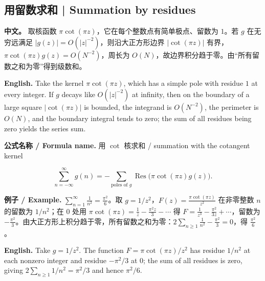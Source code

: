 \documentclass[UTF8,11pt,a4paper]{ctexart}
\newcommand{\EN}[1]{\par\noindent \textbf{English.} #1\par}
\newcommand{\FORMULA}[2]{\par\noindent\textbf{公式名称 / Formula name.} #1 / #2\par}
\newcommand{\EX}[2]{\par\noindent \textbf{例子 / Example.} #1\par\EN{#2}}
\newcommand{\APS}[2]{\par\noindent\textbf{中文。} #1\par\noindent\textbf{English.} #2\par\smallskip}
\begin{document}
\subsection{用留数求和 | Summation by residues}
\APS{取核函数 $\pi\cot(\pi z)$，它在每个整数点有简单极点、留数为 $1$。若 $g$ 在无穷远满足 $|g(z)|=O(|z|^{-2})$，则沿大正方形边界 $|\cot(\pi z)|$ 有界，$\pi\cot(\pi z)g(z)=O(N^{-2})$，周长为 $O(N)$，故边界积分趋于零。由“所有留数之和为零”得到级数和。}{Take the kernel $\pi\cot(\pi z)$, which has a simple pole with residue $1$ at every integer. If $g$ decays like $O(|z|^{-2})$ at infinity, then on the boundary of a large square $|\cot(\pi z)|$ is bounded, the integrand is $O(N^{-2})$, the perimeter is $O(N)$, and the boundary integral tends to zero; the sum of all residues being zero yields the series sum.}
\FORMULA{用 $\cot$ 核求和}{summation with the cotangent kernel}
\[
\sum_{n=-\infty}^{\infty}g(n)=-\sum_{\text{poles of }g}\operatorname{Res}\big(\pi\cot(\pi z)g(z)\big).
\]
\EX{$\sum_{n=1}^{\infty}\frac1{n^2}=\frac{\pi^2}{6}$。取 $g=1/z^2$，$F(z)=\frac{\pi\cot(\pi z)}{z^2}$ 在非零整数 $n$ 的留数为 $1/n^2$；在 $0$ 处用 $\pi\cot(\pi z)=\frac1z-\frac{\pi^2z}{3}-\cdots$ 得 $F=\frac1{z^3}-\frac{\pi^2}{3z}+\cdots$，留数为 $-\frac{\pi^2}{3}$。由大正方形上积分趋于零，所有留数之和为零：$2\sum_{n\ge1}\frac1{n^2}-\frac{\pi^2}{3}=0$，得 $\frac{\pi^2}{6}$。}{Take $g=1/z^2$. The function $F=\pi\cot(\pi z)/z^2$ has residue $1/n^2$ at each nonzero integer and residue $-\pi^2/3$ at $0$; the sum of all residues is zero, giving $2\sum_{n\ge1}1/n^2=\pi^2/3$ and hence $\pi^2/6$.}
\end{document}
